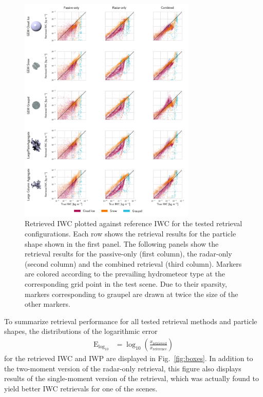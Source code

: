 \documentclass[journal abbreviation, manuscript]{copernicus}
\begin{document}
\begin{figure}
\centering \includegraphics[width = 0.75\textwidth]{../plots/results_scatter_a}
\caption{Retrieved IWC plotted against reference IWC for the tested retrieval
  configurations. Each row shows the retrieval results for the particle shape
  shown in the first panel. The following panels show the retrieval results for
  the passive-only (first column), the radar-only (second column) and the
  combined retrieval (third column). Markers are colored according to the
  prevailing hydrometeor type at the corresponding grid point in the test
  scene. Due to their sparsity, markers corresponding to graupel are drawn at
  twice the size of the other markers.}
\label{fig:results_scatter_a}
\end{figure}

To summarize retrieval performance for all tested retrieval methods and particle
shapes, the distributions of the logarithmic error
\begin{align}
  \text{E}_{\text{log}_{10}} &= \log_\text{10} \left
  (\frac{x_\text{retrieved}}{x_\text{reference}} \right )
\end{align}
for the retrieved IWC and IWP are displayed in Fig.~\ref{fig:boxes}. In addition
to the two-moment version of the radar-only retrieval, this figure also displays
results of the single-moment version of the retrieval, which was actually found
to yield better IWC retrievals for one of the scenes.
\end{document}
